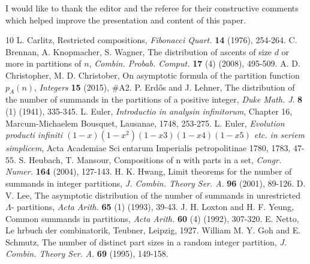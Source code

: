 \documentclass[11pt]{article}
\begin{document}
 I would like to thank the editor and the referee for their constructive comments which helped improve the presentation and content of this paper. 

\begin{thebibliography}{10}\footnotesize 
{}
L. Carlitz, Restricted compositions, {\it Fibonacci Quart.} {\bf 14} (1976), 254-264.
C. Brennan, A. Knopmacher, S. Wagner, The distribution of ascents of size $d$ or more in partitions of $n$, {\it Combin. Probab. Comput.} {\bf 17} (4) (2008), 495-509.
 A. D. Christopher, M. D. Christober, On asymptotic formula of the partition function $p_A(n)$, {\it Integers} {\bf 15} (2015), \#A2.
 P. Erd\H{o}s and J. Lehner, The distribution of the number of summands in the partitions of a positive integer, {\it Duke Math. J}. {\bf 8} (1) (1941), 335-345. 
L. Euler, {\it Introductio in analysin infinitorum}, Chapter 16, Marcum-Michaelem Bousquet, Lausanae, 1748, 253-275.
L. Euler, {\it Evolution producti infiniti $(1-x)(1-x^2)(1-x3)(1-x4)(1-x5)$ etc.
in seriem simplicem}, Acta Academiae Sci entarum Imperialis petropolitinae 1780, 1783, 47-55.
S. Heubach, T. Mansour, Compositions of n with parts in a set, {\it Congr. Numer.} {\bf 164} (2004), 127-143.
H. K. Hwang, Limit theorems for the number of summands in
integer partitions, {\it J. Combin. Theory Ser. A}. {\bf 96} (2001), 89-126.
D. V. Lee, The asymptotic distribution of the number of summands
in unrestricted $\Lambda$- partitions, {\it Acta Arith.}
{\bf 65} (1) (1993), 39-43.
J. H. Loxton and H. F. Yeung, Common summands in partitions, {\it Acta Arith.} {\bf 60} (4) (1992), 307-320.
E. Netto, Le hrbuch der combinatorik, Teubner, Leipzig, 1927.
William M. Y. Goh and E. Schmutz, The number of distinct part sizes
in a random integer partition, {\it J. Combin. Theory Ser. A}. {\bf 69} (1995), 149-158.
\end{thebibliography}
\end{document}
